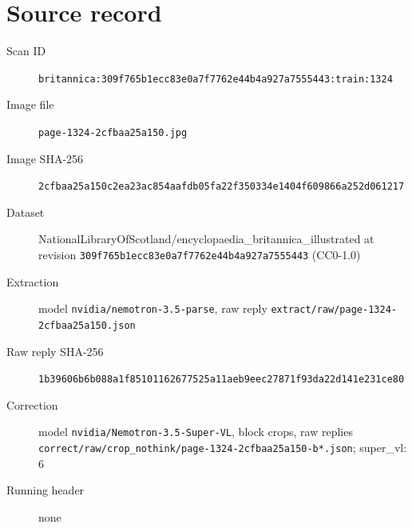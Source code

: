 \documentclass{article}
\begin{document}
\section*{Source record}
\begin{description}
\item[Scan ID] \texttt{britannica:309f765b1ecc83e0a7f7762e44b4a927a7555443:train:1324}
\item[Image file] \texttt{page-1324-2cfbaa25a150.jpg}
\item[Image SHA-256] \texttt{2cfbaa25a150c2ea23ac854aafdb05fa22f350334e1404f609866a252d061217}
\item[Dataset] NationalLibraryOfScotland/encyclopaedia\_britannica\_illustrated at revision \texttt{309f765b1ecc83e0a7f7762e44b4a927a7555443} (CC0-1.0)
\item[Extraction] model \texttt{nvidia/nemotron-3.5-parse}, raw reply \texttt{extract/raw/page-1324-2cfbaa25a150.json}
\item[Raw reply SHA-256] \texttt{1b39606b6b088a1f85101162677525a11aeb9eec27871f93da22d141e231ce80}
\item[Correction] model \texttt{nvidia/Nemotron-3.5-Super-VL}, block crops, raw replies \texttt{correct/raw/crop\_nothink/page-1324-2cfbaa25a150-b*.json}; super\_vl: 6
\item[Running header] none
\end{description}
\end{document}
